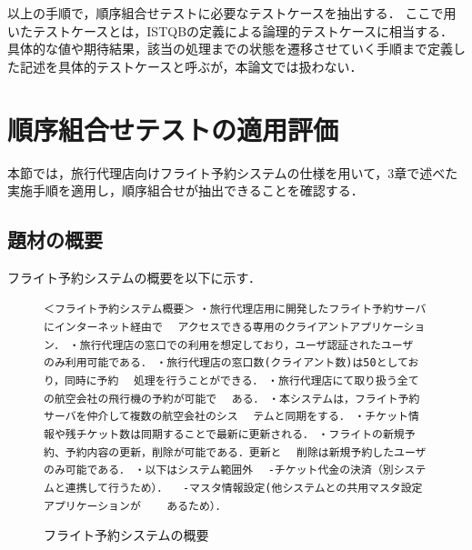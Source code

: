 \documentclass[a4paper,11pt]{jreport}
\begin{document}
以上の手順で，順序組合せテストに必要なテストケースを抽出する．
ここで用いたテストケースとは，ISTQBの定義による論理的テストケースに相当する\cite{ISTQB}．
具体的な値や期待結果，該当の処理までの状態を遷移させていく手順まで定義した記述を具体的テストケースと呼ぶが，本論文では扱わない．

\section{順序組合せテストの適用評価}

本節では，旅行代理店向けフライト予約システムの仕様を用いて，3章で述べた実施手順を適用し，順序組合せが抽出できることを確認する．
\subsection{題材の概要}
フライト予約システムの概要を以下に示す．
\begin{figure}[h]%
\vbox{%
{\scriptsize
\hbox{\verb/＜フライト予約システム概要＞/}
\hbox{\verb/・旅行代理店用に開発したフライト予約サーバにインターネット経由で/}
\hbox{\verb/　アクセスできる専用のクライアントアプリケーション．/}
\hbox{\verb/・旅行代理店の窓口での利用を想定しており，ユーザ認証されたユーザ/}
\hbox{\verb/　のみ利用可能である．/}
\hbox{\verb/・旅行代理店の窓口数(クライアント数)は50としており，同時に予約/}
\hbox{\verb/　処理を行うことができる．/}
\hbox{\verb/・旅行代理店にて取り扱う全ての航空会社の飛行機の予約が可能で/}
\hbox{\verb/　ある．/}
\hbox{\verb/・本システムは，フライト予約サーバを仲介して複数の航空会社のシス/}
\hbox{\verb/　テムと同期をする．/}
\hbox{\verb/・チケット情報や残チケット数は同期することで最新に更新される．/}
\hbox{\verb/・フライトの新規予約、予約内容の更新，削除が可能である．更新と/}
\hbox{\verb/　削除は新規予約したユーザのみ可能である．/}
\hbox{\verb/・以下はシステム範囲外/}
\hbox{\verb/　-チケット代金の決済（別システムと連携して行うため）．/}
\hbox{\verb/　-マスタ情報設定(他システムとの共用マスタ設定アプリケーションが/}
\hbox{\verb/　　あるため）．/}
}
}
\begin{center}
\end{center}
\caption{フライト予約システムの概要}
\label{OVSPEC}
\end{figure}
\end{document}
